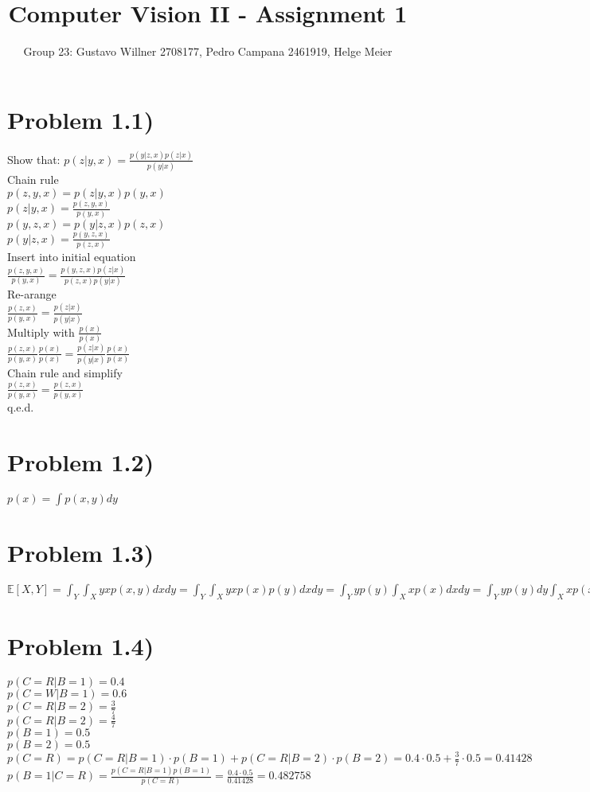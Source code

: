 \documentclass[11pt]{article} %
\title{Computer Vision II - Assignment 1}
\author{Group 23: Gustavo Willner 2708177, Pedro Campana 2461919, Helge Meier }
\date{}
\begin{document}
	\maketitle
	
	\section*{Problem 1.1)}
	Show that: $p(z \lvert y,x) = \frac{p(y \lvert z,x)p(z \lvert x)}{p(y \lvert x)}$\\
	Chain rule\\
	$p(z,y,x) = p(z \lvert y,x) p(y,x)$\\
	$p(z \lvert y,x) = \frac{p(z,y,x)}{p(y,x)} $\\
	$p(y,z,x) = p(y \lvert z,x) p(z,x)$\\
	$p(y \lvert z,x) = \frac{p(y,z,x)}{p(z,x)} $\\
	Insert into initial equation\\
	$\frac{p(z,y,x)}{p(y,x)}  = \frac{p(y,z,x)p(z \lvert x)}{p(z,x) p(y \lvert x)} $\\
	Re-arange\\
	$\frac{p(z,x)}{p(y,x)}  = \frac{p(z \lvert x)}{p(y \lvert x)} $\\
	Multiply with $\frac{p(x)}{p(x)}$\\
	$\frac{p(z,x)}{p(y,x)}\frac{p(x)}{p(x)}  = \frac{p(z \lvert x)}{p(y \lvert x)}\frac{p(x)}{p(x)} $\\
	Chain rule and simplify\\
	$\frac{p(z,x)}{p(y,x)}  = \frac{p(z , x)}{p(y , x)} $\\
	q.e.d.
	\section*{Problem 1.2)}
	$p(x) = \int p(x,y) dy$
	\section*{Problem 1.3)}
	$\mathbb{E}\left[X,Y\right] = \int_{Y} \int_{X} yxp(x,y) dxdy = \int_{Y} \int_{X} yxp(x)p(y) dxdy = \int_{Y} yp(y) \int_{X} xp(x) dxdy = \int_{Y} yp(y) dy\int_{X} xp(x) dx = \mathbb{E}\left[Y\right]\mathbb{E}\left[X\right]$\\
	\section*{Problem 1.4)}
	$p(C=R \lvert B=1) = 0.4$\\
	$p(C=W \lvert B=1) = 0.6$\\
	$p(C=R \lvert B=2) = \frac{3}{7}$\\
	$p(C=R \lvert B=2) = \frac{4}{7}$\\
	$p(B=1) = 0.5$\\
	$p(B=2) = 0.5$\\
	$p(C=R) = p(C=R \lvert B=1) \cdot p(B=1) + p(C=R \lvert B=2) \cdot p(B=2) = 0.4 \cdot 0.5 + \frac{3}{7}\cdot 0.5 = 0.41428$\\
	$p(B=1 \lvert C=R) = \frac{p(C=R \lvert B=1)p(B=1)}{p(C=R)} = \frac{0.4 \cdot 0.5}{0.41428} = 0.482758$\\
\end{document}

